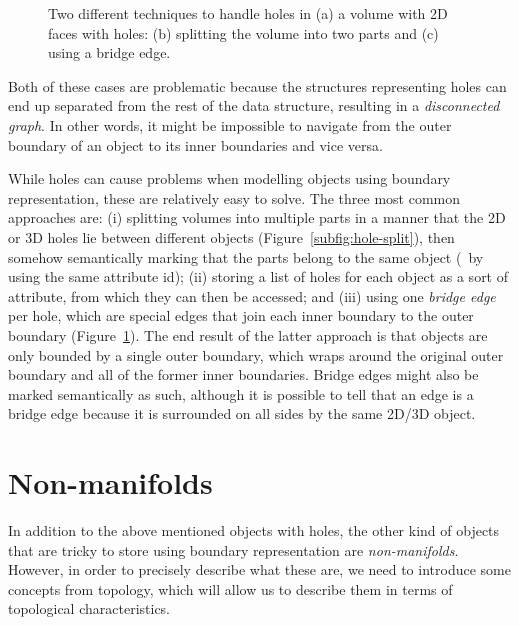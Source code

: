 \begin{figure}
\begin{subfigure}[b]{0.3\linewidth}
\caption{}%
\label{subfig:hole-bridge}
\end{subfigure}
\caption{Two different techniques to handle holes in (a) a volume with 2D faces with holes: (b) splitting the volume into two parts and (c) using a bridge edge.}%
\label{fig:hole}
\end{figure}

Both of these cases are problematic because the structures representing holes can end up separated from the rest of the data structure, resulting in a \emph{disconnected graph}.
In other words, it might be impossible to navigate from the outer boundary of an object to its inner boundaries and vice versa.

While holes can cause problems when modelling objects using boundary representation, these are relatively easy to solve.
The three most common approaches are: (i) splitting volumes into multiple parts in a manner that the 2D or 3D holes lie between different objects (Figure~\ref{subfig:hole-split}), then somehow semantically marking that the parts belong to the same object (\eg\ by using the same attribute id); (ii) storing a list of holes for each object as a sort of attribute, from which they can then be accessed; and (iii) using one \emph{bridge edge} per hole, which are special edges that join each inner boundary to the outer boundary (Figure~\ref{subfig:hole-bridge}).
The end result of the latter approach is that objects are only bounded by a single outer boundary, which wraps around the original outer boundary and all of the former inner boundaries.
Bridge edges might also be marked semantically as such, although it is possible to tell that an edge is a bridge edge because it is surrounded on all sides by the same 2D/3D object.


\section{Non-manifolds}

In addition to the above mentioned objects with holes, the other kind of objects that are tricky to store using boundary representation are \emph{non-manifolds}.
However, in order to precisely describe what these are, we need to introduce some concepts from topology, which will allow us to describe them in terms of topological characteristics.

